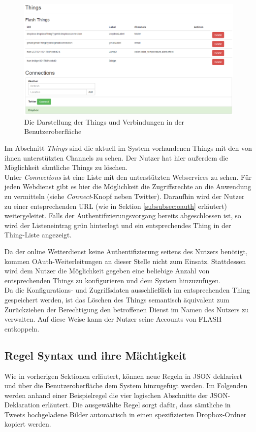 \begin{figure}
	\centering
	\includegraphics[angle=90, height=\textheight]{bilder/gui_all4_4}
	\caption{Die Darstellung der Things und Verbindungen in der Benutzeroberfläche}
	\label{fig:gui_2}
\end{figure}

Im Abschnitt \textit{Things} sind die aktuell im System vorhandenen Things mit den von ihnen unterstützten Channels zu sehen. Der Nutzer hat hier außerdem die Möglichkeit sämtliche Things zu löschen.\\

Unter \textit{Connections} ist eine Liste mit den unterstützten Webservices zu sehen. Für jeden Webdienst gibt es hier die Möglichkeit die Zugriffsrechte an die Anwendung zu vermitteln (siehe \textit{Connect}-Knopf neben Twitter). Daraufhin wird der Nutzer zu einer entsprechenden URL (wie in Sektion \ref{subsubsec:oauth} erläutert) weitergeleitet. 
Falls der Authentifizierungsvorgang bereits abgeschlossen ist, so wird der Listeneintrag grün hinterlegt und ein entsprechendes Thing in der Thing-Liste angezeigt. 

Da der online Wetterdienst keine Authentifizierung seitens des Nutzers benötigt, kommen OAuth-Weiterleitungen an dieser Stelle nicht zum Einsatz. Stattdessen wird dem Nutzer die Möglichkeit gegeben eine beliebige Anzahl von entsprechenden Things zu konfigurieren und dem System hinzuzufügen.\\

Da die Konfigurations- und Zugriffsdaten ausschließlich im entsprechenden Thing gespeichert werden, ist das Löschen des Things semantisch äquivalent zum Zurückziehen der Berechtigung den betroffenen Dienst im Namen des Nutzers zu verwalten. Auf diese Weise kann der Nutzer seine Accounts von FLASH entkoppeln.


\subsection{Regel Syntax und ihre Mächtigkeit}
Wie in vorherigen Sektionen erläutert, können neue Regeln in JSON deklariert und über die Benutzeroberfläche dem System hinzugefügt werden. Im Folgenden werden anhand einer Beispielregel die vier logischen Abschnitte der JSON-Deklaration erläutert. Die ausgewählte Regel sorgt dafür, dass sämtliche in Tweets hochgeladene Bilder automatisch in einen spezifizierten Dropbox-Ordner kopiert werden.

